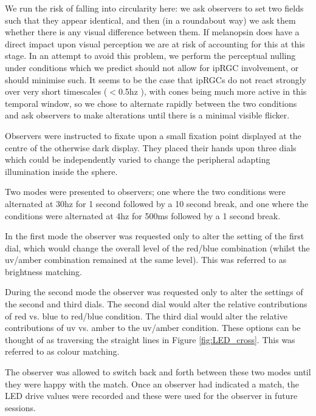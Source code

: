 We run the risk of falling into circularity here: we ask observers to set two fields such that they appear identical, and then (in a roundabout way) we ask them whether there is any visual difference between them. If melanopsin does have a direct impact upon visual perception we are at risk of accounting for this at this stage. In an attempt to avoid this problem, we perform the perceptual nulling under conditions which we predict should not allow for \gls{ipRGC} involvement, or should minimise such. It seems to be the case that \glspl{ipRGC} do not react strongly over very short timescales ($<$0.5hz \citep{spitschan_human_2017-1}), with cones being much more active in this temporal window, so we chose to alternate rapidly between the two conditions and ask observers to make alterations until there is a minimal visible flicker.

Observers were instructed to fixate upon a small fixation point displayed at the centre of the otherwise dark display. They placed their hands upon three dials which could be independently varied to change the peripheral adapting illumination inside the sphere.

Two modes were presented to observers; one where the two conditions were alternated at 30hz for 1 second followed by a 10 second break, and one where the conditions were alternated at 4hz for 500ms followed by a 1 second break. 

In the first mode the observer was requested only to alter the setting of the first dial, which would change the overall level of the red/blue combination (whilst the uv/amber combination remained at the same level). This was referred to as brightness matching.

During the second mode the observer was requested only to alter the settings of the second and third dials. The second dial would alter the relative contributions of red vs. blue to red/blue condition. The third dial would alter the relative contributions of uv vs. amber to the uv/amber condition. These options can be thought of as traversing the straight lines in Figure \ref{fig:LED_cross}. This was referred to as colour matching.


The observer was allowed to switch back and forth between these two modes until they were happy with the match. Once an observer had indicated a match, the LED drive values were recorded and these were used for the observer in future sessions.

